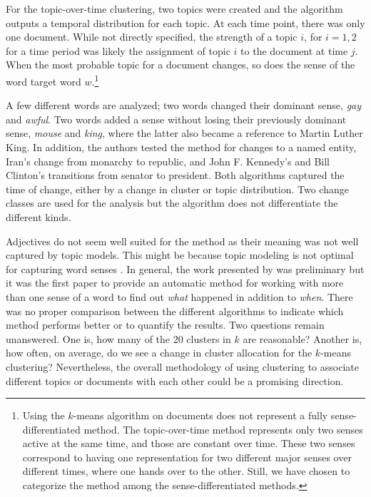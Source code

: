 \documentclass[output=paper]{langsci/langscibook}
\begin{document}
For the topic-over-time clustering, two topics were created and the algorithm outputs a temporal distribution for each topic. At each time point, there was only one document. While not directly specified, the strength of a topic $i$, for $i = 1 , 2$ for a time period was likely the assignment of topic $i$ to the document at time $j$. When the most probable topic for a document changes, so does the sense of the word target word $w$.\footnote{Using the $k$-means algorithm on documents does not represent a fully sense-differentiated method. The topic-over-time method represents only two senses active at the same time, and those are constant over time. These two senses correspond to having one representation for two different major senses over different times, where one hands over to the other. Still,  we have chosen to categorize the method among the sense-differentiated methods.  }

A few different words are analyzed; two words changed their dominant sense, \emph{gay} and \emph{awful}. Two words added a sense without losing their previously dominant sense, \emph{mouse} and \emph{king}, where the latter also became a reference to Martin Luther King. In addition, the authors tested the method for changes to a named entity, Iran's change from monarchy to republic, and John F. Kennedy's and Bill Clinton's transitions from senator to president. Both algorithms captured the time of change, either by a change in cluster or topic distribution. Two change classes are used for the analysis but the algorithm does not differentiate the different kinds.

Adjectives do not seem well suited for the method as their meaning was not well captured by topic models. This might be because topic modeling is not optimal for capturing word senses \citep{topicmodelswsd}. 
In general, the work presented by \citet{wijaya2011understanding} was preliminary but it was the first paper to provide an automatic method for working with more than one sense of a word to find out \emph{what} happened in addition to \emph{when}. There was no proper comparison between the different algorithms to indicate which method performs better or to quantify the results. Two questions remain unanswered. One is, how many of the 20 clusters in $k$ are reasonable? Another is, how often, on average, do we see a change in cluster allocation for the $k$-means clustering? Nevertheless, the overall methodology of using clustering to associate different topics or documents with each other could be a promising direction. 
 
\end{document}
